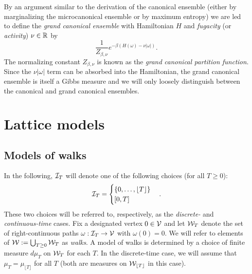 By an argument similar to the derivation of the canonical ensemble (either by marginalizing
the microcanonical ensemble or by maximum entropy) we are led to define the \emph{grand
canonical ensemble} with Hamiltonian $H$ and \emph{fugacity} (or \emph{activity}) $\nu \in {\mathbb R}$ by
\begin{equation}
\frac{1}{Z_{\beta,\nu}} e^{-\beta (H(\omega) - \nu |\omega|)}.
\end{equation}
The normalizing constant $Z_{\beta,\nu}$ is known as the \emph{grand canonical partition function}.
Since the $\nu |\omega|$ term can be absorbed into the Hamiltonian,
the grand canonical ensemble is itself a Gibbs measure and we will only loosely
distinguish between the canonical and grand canonical ensembles. 

\begin{example}
\end{example}


\section{Lattice models}



\subsection{Models of walks}

In the following, $\mathcal{I}_T$ will denote one of the following choices (for all $T \ge 0$):
\begin{equation}
\mathcal{I}_T
  =
\begin{cases}
\{ 0, \ldots, \lfloor T \rfloor \} \\
[0, T]
\end{cases}.
\end{equation}
These two choices will be referred to, respectively, as the \emph{discrete-} and
\emph{continuous-time} cases.
Fix a designated vertex $0 \in \mathcal{V}$ and
let $\mathcal{W}_T$ denote the set of
right-continuous paths $\omega : \mathcal{I}_T \rightarrow \mathcal{V}$ with $\omega(0) = 0$.
We will refer to elements of $\mathcal{W} := \bigcup_{T \geq 0} \mathcal{W}_T$ as \emph{walks}.
A model of walks is determined by a choice of finite measure $d\mu_T$ on
$\mathcal{W}_T$ for each $T$.
In the discrete-time case, we will assume that
$\mu_T = \mu_{\lfloor T \rfloor}$ for all $T$ (both are measures on
$\mathcal{W}_{\lfloor T \rfloor}$ in this case).

